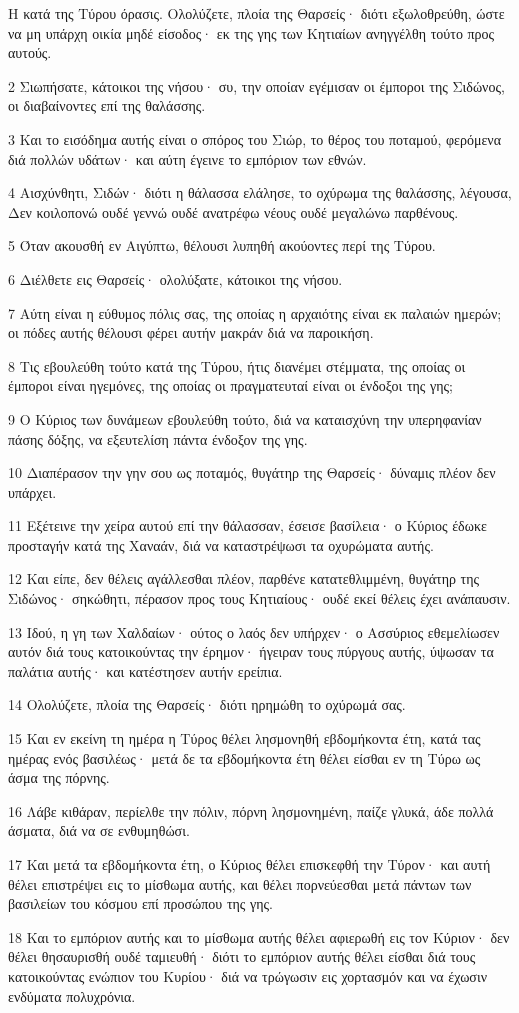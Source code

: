 \par Η κατά της Τύρου όρασις. Ολολύζετε, πλοία της Θαρσείς· διότι εξωλοθρεύθη, ώστε να μη υπάρχη οικία μηδέ είσοδος· εκ της γης των Κητιαίων ανηγγέλθη τούτο προς αυτούς.
\par 2 Σιωπήσατε, κάτοικοι της νήσου· συ, την οποίαν εγέμισαν οι έμποροι της Σιδώνος, οι διαβαίνοντες επί της θαλάσσης.
\par 3 Και το εισόδημα αυτής είναι ο σπόρος του Σιώρ, το θέρος του ποταμού, φερόμενα διά πολλών υδάτων· και αύτη έγεινε το εμπόριον των εθνών.
\par 4 Αισχύνθητι, Σιδών· διότι η θάλασσα ελάλησε, το οχύρωμα της θαλάσσης, λέγουσα, Δεν κοιλοπονώ ουδέ γεννώ ουδέ ανατρέφω νέους ουδέ μεγαλώνω παρθένους.
\par 5 Όταν ακουσθή εν Αιγύπτω, θέλουσι λυπηθή ακούοντες περί της Τύρου.
\par 6 Διέλθετε εις Θαρσείς· ολολύξατε, κάτοικοι της νήσου.
\par 7 Αύτη είναι η εύθυμος πόλις σας, της οποίας η αρχαιότης είναι εκ παλαιών ημερών; οι πόδες αυτής θέλουσι φέρει αυτήν μακράν διά να παροικήση.
\par 8 Τις εβουλεύθη τούτο κατά της Τύρου, ήτις διανέμει στέμματα, της οποίας οι έμποροι είναι ηγεμόνες, της οποίας οι πραγματευταί είναι οι ένδοξοι της γης;
\par 9 Ο Κύριος των δυνάμεων εβουλεύθη τούτο, διά να καταισχύνη την υπερηφανίαν πάσης δόξης, να εξευτελίση πάντα ένδοξον της γης.
\par 10 Διαπέρασον την γην σου ως ποταμός, θυγάτηρ της Θαρσείς· δύναμις πλέον δεν υπάρχει.
\par 11 Εξέτεινε την χείρα αυτού επί την θάλασσαν, έσεισε βασίλεια· ο Κύριος έδωκε προσταγήν κατά της Χαναάν, διά να καταστρέψωσι τα οχυρώματα αυτής.
\par 12 Και είπε, δεν θέλεις αγάλλεσθαι πλέον, παρθένε κατατεθλιμμένη, θυγάτηρ της Σιδώνος· σηκώθητι, πέρασον προς τους Κητιαίους· ουδέ εκεί θέλεις έχει ανάπαυσιν.
\par 13 Ιδού, η γη των Χαλδαίων· ούτος ο λαός δεν υπήρχεν· ο Ασσύριος εθεμελίωσεν αυτόν διά τους κατοικούντας την έρημον· ήγειραν τους πύργους αυτής, ύψωσαν τα παλάτια αυτής· και κατέστησεν αυτήν ερείπια.
\par 14 Ολολύζετε, πλοία της Θαρσείς· διότι ηρημώθη το οχύρωμά σας.
\par 15 Και εν εκείνη τη ημέρα η Τύρος θέλει λησμονηθή εβδομήκοντα έτη, κατά τας ημέρας ενός βασιλέως· μετά δε τα εβδομήκοντα έτη θέλει είσθαι εν τη Τύρω ως άσμα της πόρνης.
\par 16 Λάβε κιθάραν, περίελθε την πόλιν, πόρνη λησμονημένη, παίζε γλυκά, άδε πολλά άσματα, διά να σε ενθυμηθώσι.
\par 17 Και μετά τα εβδομήκοντα έτη, ο Κύριος θέλει επισκεφθή την Τύρον· και αυτή θέλει επιστρέψει εις το μίσθωμα αυτής, και θέλει πορνεύεσθαι μετά πάντων των βασιλείων του κόσμου επί προσώπου της γης.
\par 18 Και το εμπόριον αυτής και το μίσθωμα αυτής θέλει αφιερωθή εις τον Κύριον· δεν θέλει θησαυρισθή ουδέ ταμιευθή· διότι το εμπόριον αυτής θέλει είσθαι διά τους κατοικούντας ενώπιον του Κυρίου· διά να τρώγωσιν εις χορτασμόν και να έχωσιν ενδύματα πολυχρόνια.

